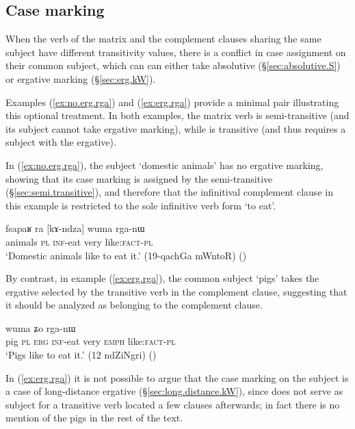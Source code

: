 \subsection{Case marking} \label{sec:complement.clause.case.marking}
When the verb of the matrix and the complement clauses sharing the same subject have different transitivity values, there is a conflict in case assignment on their common subject, which can can either take absolutive (§\ref{sec:absolutive.S}) or ergative marking (§\ref{sec:erg.kW}). 

Examples (\ref{ex:no.erg.rga}) and  (\ref{ex:erg.rga})  provide a minimal pair illustrating this optional treatment. In both examples, the matrix verb  is semi-transitive (and its subject cannot take ergative marking), while  is transitive (and thus requires a subject with the ergative).

In (\ref{ex:no.erg.rga}), the subject  `domestic animals' has no ergative marking, showing that its case marking is assigned by the semi-transitive  (§\ref{sec:semi.transitive}), and therefore that the infinitival complement clause in this example is restricted to the sole infinitive verb form  `to eat'.

\begin{exe}
\ex \label{ex:no.erg.rga}
\gll fsapaʁ ra [kɤ-ndza] wuma rga-nɯ  \\
animals \textsc{pl}  \textsc{inf}-eat very  like:\textsc{fact}-\textsc{pl} \\
\glt `Domestic animals like to eat it.' (19-qachGa mWntoR)
()
\end{exe}

By contrast, in example (\ref{ex:erg.rga}), the common subject   `pigs' takes the ergative  selected by the transitive verb   in the complement clause, suggesting that it should be analyzed as belonging to the complement clause.

\begin{exe}
\ex \label{ex:erg.rga}
 wuma ʑo rga-nɯ \\
pig \textsc{pl} \textsc{erg} \textsc{inf}-eat very \textsc{emph}  like:\textsc{fact}-\textsc{pl} \\
 \glt `Pigs like to eat it.' (12 ndZiNgri)
()
\end{exe}

In (\ref{ex:erg.rga}) it is not possible to argue that the case marking on the subject is a case of long-distance ergative (§\ref{sec:long.distance.kW}), since   does not serve as subject for a transitive verb located a few clauses afterwards; in fact there is no mention of the pigs in the rest of the text.


